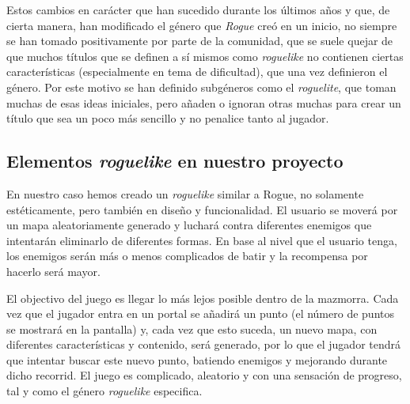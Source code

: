Estos cambios en carácter que han sucedido durante los últimos años y que, de cierta manera, han modificado el género que \textit{Rogue} creó en un inicio, no siempre se han tomado positivamente por parte de la comunidad, que se suele quejar de que muchos títulos que se definen a sí mismos como \textit{roguelike} no contienen ciertas características (especialmente en tema de dificultad), que una vez definieron el género. Por este motivo se han definido subgéneros como el \textit{roguelite}, que toman muchas de esas ideas iniciales, pero añaden o ignoran otras muchas para crear un título que sea un poco más sencillo y no penalice tanto al jugador.

\subsection{Elementos \textit{roguelike} en nuestro proyecto}

En nuestro caso hemos creado un \textit{roguelike} similar a Rogue, no solamente estéticamente, pero también en diseño y funcionalidad. El usuario se moverá por un mapa aleatoriamente generado y luchará contra diferentes enemigos que intentarán eliminarlo de diferentes formas. En base al nivel que el usuario tenga, los enemigos serán más o menos complicados de batir y la recompensa por hacerlo será mayor.

El objectivo del juego es llegar lo más lejos posible dentro de la mazmorra. Cada vez que el jugador entra en un portal se añadirá un punto (el número de puntos se mostrará en la pantalla) y, cada vez que esto suceda, un nuevo mapa, con diferentes características y contenido, será generado, por lo que el jugador tendrá que intentar buscar este nuevo punto, batiendo enemigos y mejorando durante dicho recorrid. El juego es complicado, aleatorio y con una sensación de progreso, tal y como el género \textit{roguelike} especifica.

